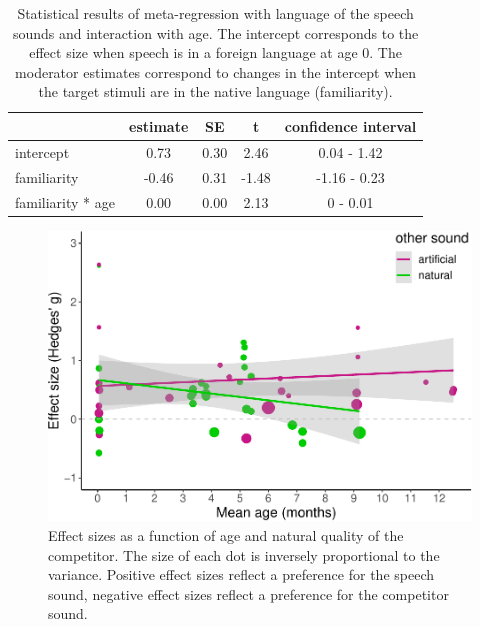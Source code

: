 \documentclass[
  man]{apa6}
\begin{document}
\begin{table}[tbp]
\begin{center}
\begin{threeparttable}
\caption{\label{tab:TableLang}Statistical results of meta-regression with language of the speech sounds and interaction with age. The intercept corresponds to the effect size when speech is in a foreign language at age 0. The moderator estimates correspond to changes in the intercept when the target stimuli are in the native language (familiarity).}
\begin{tabular}{lcccc}
\toprule
 & estimate & SE & t & confidence interval\\
\midrule
intercept & 0.73 & 0.30 & 2.46 & 0.04 - 1.42\\
familiarity & -0.46 & 0.31 & -1.48 & -1.16 - 0.23\\
familiarity * age & 0.00 & 0.00 & 2.13 & 0 - 0.01\\
\bottomrule
\end{tabular}
\end{threeparttable}
\end{center}
\end{table}

\begin{figure}
\centering
\includegraphics{MA_speech_pref_files/figure-latex/natural-1.pdf}
\caption{\label{fig:natural}Effect sizes as a function of age and natural quality of the competitor. The size of each dot is inversely proportional to the variance. Positive effect sizes reflect a preference for the speech sound, negative effect sizes reflect a preference for the competitor sound.}
\end{figure}
\end{document}
